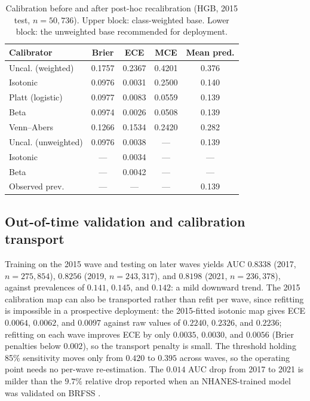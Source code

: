 \documentclass[conference]{IEEEtran}
\begin{document}
\begin{table}[!t]
\caption{Calibration before and after post-hoc recalibration (HGB, 2015 test, $n=50{,}736$). Upper block: class-weighted base. Lower block: the unweighted base recommended for deployment.}
\label{tab:cal}
\centering
\footnotesize
\begin{tabular}{lcccc}
\toprule
Calibrator & Brier & ECE & MCE & Mean pred. \\
\midrule
Uncal. (weighted) & 0.1757 & 0.2367 & 0.4201 & 0.376 \\
\quad Isotonic & 0.0976 & 0.0031 & 0.2500 & 0.140 \\
\quad Platt (logistic) & 0.0977 & 0.0083 & 0.0559 & 0.139 \\
\quad Beta & 0.0974 & 0.0026 & 0.0508 & 0.139 \\
\quad Venn--Abers & 0.1266 & 0.1534 & 0.2420 & 0.282 \\
\midrule
Uncal. (unweighted) & 0.0976 & 0.0038 & --- & 0.139 \\
\quad Isotonic & --- & 0.0034 & --- & --- \\
\quad Beta & --- & 0.0042 & --- & --- \\
\midrule
Observed prev. & --- & --- & --- & 0.139 \\
\bottomrule
\end{tabular}
\end{table}

\subsection{Out-of-time validation and calibration transport}
Training on the 2015 wave and testing on later waves yields AUC $0.8338$ (2017, $n = 275{,}854$), $0.8256$ (2019, $n = 243{,}317$), and $0.8198$ (2021, $n = 236{,}378$), against prevalences of $0.141$, $0.145$, and $0.142$: a mild downward trend. The 2015 calibration map can also be transported rather than refit per wave, since refitting is impossible in a prospective deployment: the 2015-fitted isotonic map gives ECE $0.0064$, $0.0062$, and $0.0097$ against raw values of $0.2240$, $0.2326$, and $0.2236$; refitting on each wave improves ECE by only $0.0035$, $0.0030$, and $0.0056$ (Brier penalties below $0.002$), so the transport penalty is small. The threshold holding 85\% sensitivity moves only from $0.420$ to $0.395$ across waves, so the operating point needs no per-wave re-estimation. The $0.014$ AUC drop from 2017 to 2021 is milder than the $9.7\%$ relative drop reported when an NHANES-trained model was validated on BRFSS \cite{pall2026comprehensive}.
\end{document}

